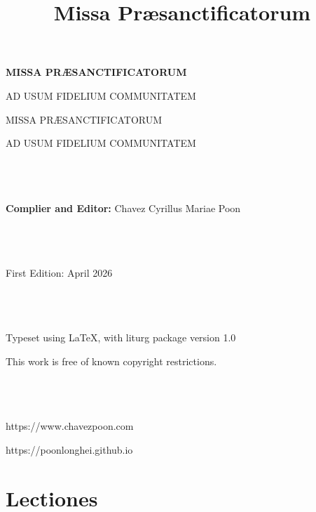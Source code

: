 \documentclass[12pt, a4paper]{article}
\title{Missa Præsanctificatorum}
\date{}
\begin{document}
	\begin{titlepage}
		\centering
		\vspace*{3cm}
		{\Huge\bfseries MISSA PRÆSANCTIFICATORUM\par}
		\vspace{2cm}
		{\Large AD USUM FIDELIUM COMMUNITATEM\par}
		\vfill
	\end{titlepage}
	
	\newpage
	
	\setlength{\leftskip}{0cm}
	
	{\LARGE MISSA PRÆSANCTIFICATORUM}
	\\
	\setlength{\leftskip}{0cm}
	
	{\large AD USUM FIDELIUM COMMUNITATEM}
	\\\\
	\\\\
	\setlength{\leftskip}{0cm}
	
	{\large \textbf{Complier and Editor:} Chavez Cyrillus Mariae Poon}
	\\\\
	\\\\
	\setlength{\leftskip}{0cm}
	
	{\large First Edition: April 2026}
	\\\\
	\\\\
	\setlength{\leftskip}{0cm}
	
	{\large Typeset using \LaTeX, with liturg package version 1.0}
	\\
	\setlength{\leftskip}{0cm}
	
	{\large This work is free of known copyright restrictions.}
	\\\\
	\\\\
	\setlength{\leftskip}{0cm}
	
	{\large https://www.chavezpoon.com}
	\\
	\setlength{\leftskip}{0cm}
	
	{\large https://poonlonghei.github.io}
	
	\newpage
	
	\section*{Lectiones}
	
\end{document}
